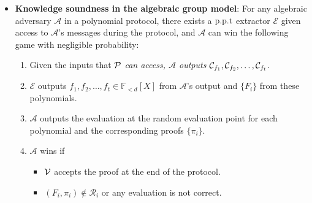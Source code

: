 \begin{definition}
\begin{itemize}
    \item \textbf{Knowledge soundness in the algebraic group model}: For any algebraic adversary $\mathcal{A}$ in a polynomial protocol, there exists a $\text{p.p.t}$ extractor $\mathcal{E}$ given access to $\mathcal{A}$'s messages during the protocol, and $\mathcal{A}$ can win the following game with negligible probability:
    \begin{enumerate}
        \item Given the inputs that $\mathcal{P}$ \textit{can access, $\mathcal{A}$ outputs} $\mathcal{C}_{f_1},\mathcal{C}_{f_2},\dots,\mathcal{C}_{f_t}$.
        \item $\mathcal{E}$ outputs $f_1,f_2,\dots,f_t\in\mathbb{F}_{<d}[X]$ from $\mathcal{A}$'s output and $\{F_i\}$ from these polynomials.
        \item $\mathcal{A}$ outputs the evaluation at the random evaluation point for each polynomial and the corresponding proofs $\{\pi_i\}$.
        \item $\mathcal{A}$ wins if
        \begin{itemize}
            \item $\mathcal{V}$ accepts the proof at the end of the protocol.
            \item $(F_i,\pi_i)\notin\mathcal{R}_i$ or any evaluation is not correct.
        \end{itemize}
    \end{enumerate}
\end{itemize}
\end{definition}
